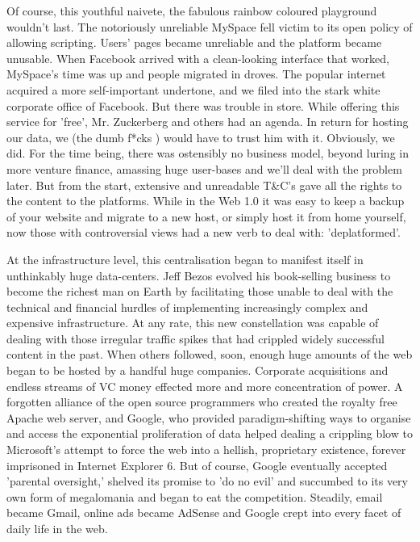 Of course, this youthful naivete, the fabulous rainbow coloured playground wouldn't last. The notoriously unreliable MySpace fell victim to its open policy of allowing scripting. Users' pages became unreliable and the platform became unusable. When Facebook arrived with a clean-looking interface that worked, MySpace's time was up and people migrated in droves. The popular internet acquired a more self-important undertone, and we filed into the stark white corporate office of Facebook. But there was trouble in store. While offering this service for 'free', Mr. Zuckerberg and others had an agenda. In return for hosting our data, we (the dumb f*cks \cite{carlson2010ims}) would have to trust him with it. Obviously, we did. For the time being, there was ostensibly no business model, beyond luring in more venture finance, amassing huge user-bases and we'll deal with the problem later. But from the start, extensive and unreadable T\&C's gave all the rights to the content to the platforms. While in the Web 1.0 it was easy to keep a backup of your website and migrate to a new host, or simply host it from home yourself, now those with controversial views had a new verb to deal with: 'deplatformed'.

At the infrastructure level, this centralisation began to manifest itself in unthinkably huge data-centers. Jeff Bezos evolved his book-selling business to become the richest man on Earth by facilitating those unable to deal with the technical and financial hurdles of implementing increasingly complex and expensive infrastructure. At any rate, this new constellation was capable of dealing with those irregular traffic spikes that had crippled widely successful content in the past. When others followed, soon, enough huge amounts of the web began to be hosted by a handful huge companies. Corporate acquisitions and endless streams of VC money effected more and more concentration of power. A forgotten alliance of the open source programmers who created the royalty free Apache web server, and Google, who provided paradigm-shifting ways to organise and access the exponential proliferation of data helped dealing a crippling blow to Microsoft's attempt to force the web into a hellish, proprietary existence, forever imprisoned in Internet Explorer 6. But of course, Google eventually accepted 'parental oversight,' shelved its promise to 'do no evil' and succumbed to its very own form of megalomania and began to eat the competition. Steadily, email became Gmail, online ads became AdSense and Google crept into every facet of daily life in the web.

